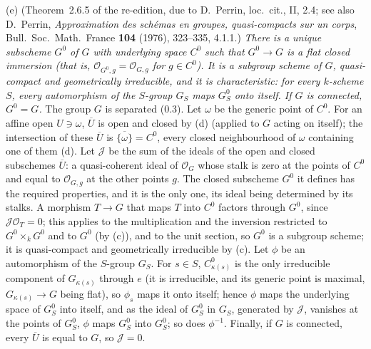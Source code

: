 \label{thm:sga3-VIA-2.6.5}%
(e) (Theorem~2.6.5 of the re-edition, due to D.~Perrin, loc.\ cit., II, 2.4; see also D.~Perrin,
\emph{Approximation des schémas en groupes, quasi-compacts sur un corps}, Bull.\ Soc.\ Math.\ France
\textbf{104} (1976), 323--335, 4.1.1.) \emph{There is a unique subscheme \(G^0\) of \(G\) with
underlying space \(C^0\) such that \(G^0\to G\) is a flat closed immersion \textup{(}that is,
\(\mathcal O_{G^0,g}=\mathcal O_{G,g}\) for \(g\in C^0\)\textup{)}. It is a subgroup scheme of \(G\),
quasi-compact and geometrically irreducible, and it is characteristic: for every \(k\)-scheme \(S\),
every automorphism of the \(S\)-group \(G_S\) maps \(G^0_S\) onto itself. If \(G\) is connected,
\(G^0=G\).} The group \(G\) is separated (0.3). Let \(\omega\) be the generic point of \(C^0\). For an
affine open \(U\ni\omega\), \(\overline U\) is open and closed by (d) (applied to \(G\) acting on
itself); the intersection of these \(\overline U\) is \(\overline{\{\omega\}}=C^0\), every closed
neighbourhood of \(\omega\) containing one of them (d). Let \(\mathcal J\) be the sum of the ideals
of the open and closed subschemes \(\overline U\): a quasi-coherent ideal of \(\mathcal O_G\) whose
stalk is zero at the points of \(C^0\) and equal to \(\mathcal O_{G,g}\) at the other points \(g\).
The closed subscheme \(G^0\) it defines has the required properties, and it is the only one, its
ideal being determined by its stalks. A morphism \(T\to G\) that maps \(T\) into \(C^0\) factors
through \(G^0\), since \(\mathcal J\mathcal O_T=0\); this applies to the multiplication and the
inversion restricted to \(G^0\times_kG^0\) and to \(G^0\) (by (c)), and to the unit section, so
\(G^0\) is a subgroup scheme; it is quasi-compact and geometrically irreducible by (c). Let \(\phi\)
be an automorphism of the \(S\)-group \(G_S\). For \(s\in S\), \(C^0_{\kappa(s)}\) is the only
irreducible component of \(G_{\kappa(s)}\) through \(e\) (it is irreducible, and its generic point is
maximal, \(G_{\kappa(s)}\to G\) being flat), so \(\phi_s\) maps it onto itself; hence \(\phi\) maps
the underlying space of \(G^0_S\) into itself, and as the ideal of \(G^0_S\) in \(G_S\), generated by
\(\mathcal J\), vanishes at the points of \(G^0_S\), \(\phi\) maps \(G^0_S\) into \(G^0_S\); so does
\(\phi^{-1}\). Finally, if \(G\) is connected, every \(\overline U\) is equal to \(G\), so
\(\mathcal J=0\).

